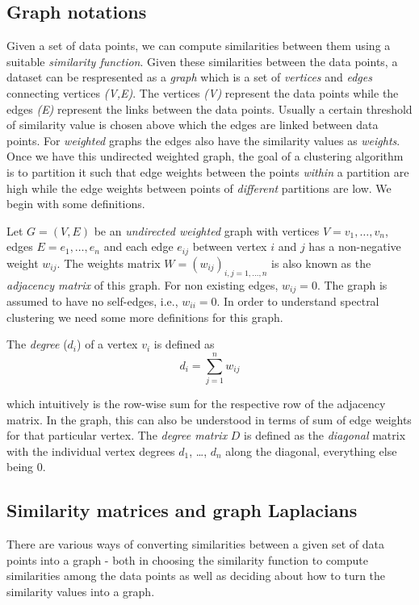 \subsection{Graph notations}
Given a set of data points, we can compute similarities between them using a suitable \textit{similarity function}. Given these similarities between the data points, a dataset can be respresented as a \textit{graph} which is a set of \textit{vertices} and \textit{edges} connecting vertices \textit{(V,E)}. The vertices \textit{(V)} represent the data points while the edges \textit{(E)} represent the links between the data points. Usually a certain threshold of similarity value is chosen above which the edges are linked between data points. For \textit{weighted} graphs the edges also have the similarity values as \textit{weights}. Once we have this undirected weighted graph, the goal of a clustering algorithm is to partition it such that edge weights between the points \textit{within} a partition are high while the edge weights between points of \textit{different} partitions are low. We begin with some definitions.

Let $G = (V,E)$ be an \textit{undirected weighted} graph with vertices $V = {v_{1},\dots,v_{n}}$, edges $E= {e_{1},\dots,e_{n}}$ and each edge $e_{ij}$ between vertex $i$ and $j$  has a non-negative weight $w_{ij}$. The weights matrix $W = (w_{ij})_{i,j=1,\dots,n}$ is also known as the \textit{adjacency matrix} of this graph. For non existing edges, $w_{ij}=0$. The graph is assumed to have no self-edges, i.e., $w_{ii}=0$. In order to understand spectral clustering we need some more definitions for this graph.

The \textit{degree} ($d_{i}$) of a vertex $v_{i}$ is defined as
\[
d_{i} = \sum_{j=1}^{n}w_{ij}
\]

which intuitively is the row-wise sum for the respective row of the adjacency matrix. In the graph, this can also be understood in terms of sum of edge weights for that particular vertex. The \textit{degree matrix} $D$ is defined as the \textit{diagonal} matrix with the individual vertex degrees $d_{1}$, \dots, $d_{n}$ along the diagonal, everything else being $0$.

\subsection{Similarity matrices and graph Laplacians}
There are various ways of converting similarities between a given set of data points into a graph - both in choosing the similarity function to compute similarities among the data points as well as deciding about how to turn the similarity values into a graph.

